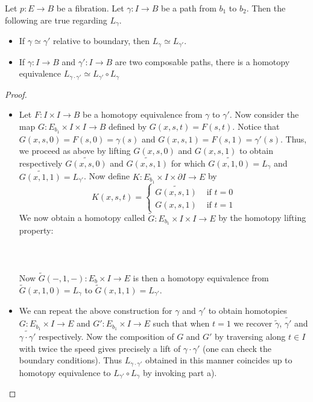 \documentclass[a4paper]{article}
\begin{document}
\begin{lmm}{}{} Let $p:E\to B$ be a fibration. Let $\gamma:I\to B$ be a path from $b_1$ to $b_2$. Then the following are true regarding $L_\gamma$. 
\begin{itemize}
\item If $\gamma\simeq\gamma'$ relative to boundary, then $L_\gamma\simeq L_{\gamma'}$.
\item If $\gamma:I\to B$ and $\gamma':I\to B$ are two composable paths, there is a homotopy equivalence $L_{\gamma\cdot\gamma'}\simeq L_{\gamma'}\circ L_\gamma$
\end{itemize} \tcbline
\begin{proof}
\begin{itemize}
\item Let $F:I\times I\to B$ be a homotopy equivalence from $\gamma$ to $\gamma'$. Now consider the map $G:E_{b_1}\times I\times I\to B$ defined by $G(x,s,t)=F(s,t)$. Notice that $G(x,s,0)=F(s,0)=\gamma(s)$ and $G(x,s,1)=F(s,1)=\gamma'(s)$. Thus, we proceed as above by lifting $G(x,s,0)$ and $G(x,s,1)$ to obtain respectively $\widetilde{G(x,s,0)}$ and $\widetilde{G(x,s,1)}$ for which $\widetilde{G(x,1,0)}=L_\gamma$ and $\widetilde{G(x,1,1)}=L_{\gamma'}$. Now define $K:E_{b_1}\times I\times\partial I\to E$ by $$K(x,s,t)=\begin{cases}
\widetilde{G(x,s,1)} & \text{ if } t=0\\
G(x,s,1) & \text{ if } t=1
\end{cases}$$ We now obtain a homotopy called $\widetilde{G}:E_{b_1}\times I\times I\to E$ by the homotopy lifting property: \\~\\
 \\~\\
Now $\tilde{G}(-,1,-):E_b\times I\to E$ is then a homotopy equivalence from $\widetilde{G}(x,1,0)=L_\gamma$ to $\widetilde{G}(x,1,1)=L_{\gamma'}$. 
\item We can repeat the above construction for $\gamma$ and $\gamma'$ to obtain homotopies $G:E_{b_1}\times I\to E$ and $G':E_{b_1}\times I\to E$ such that when $t=1$ we recover $\tilde{\gamma}$, $\tilde{\gamma'}$ and $\tilde{\gamma\cdot\gamma'}$ respectively. Now the composition of $G$ and $G'$ by traversing along $t\in I$ with twice the speed gives precisely a lift of $\gamma\cdot\gamma'$ (one can check the boundary conditions). Thus $L_{\gamma\cdot\gamma'}$ obtained in this manner coincides up to homotopy equivalence to $L_{\gamma'}\circ L_\gamma$ by invoking part a). 
\end{itemize}
\end{proof}
\end{lmm}
\end{document}
